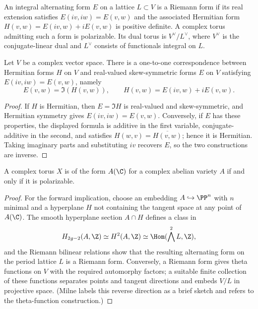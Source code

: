\begin{definition}
\label{def:milne-riemann-form}

An integral alternating form $E$ on a lattice $L\subset V$ is a Riemann form
if its real extension satisfies $E(iv,iw)=E(v,w)$ and the associated Hermitian
form $H(v,w)=E(iv,w)+iE(v,w)$ is positive definite.  A complex torus admitting
such a form is polarizable.  Its dual torus is $V^\vee/L^\vee$, where
$V^\vee$ is the conjugate-linear dual and $L^\vee$ consists of functionals
integral on $L$.
\end{definition}

\begin{lemma}
\label{lem:milne-riemann-hermitian}

Let $V$ be a complex vector space.  There is a one-to-one correspondence
between Hermitian forms $H$ on $V$ and real-valued skew-symmetric forms $E$ on
$V$ satisfying $E(iv,iw)=E(v,w)$, namely
\[
 E(v,w)=\Im(H(v,w)),\qquad
 H(v,w)=E(iv,w)+iE(v,w).
\]
\end{lemma}

\begin{proof}
If $H$ is Hermitian, then $E=\Im H$ is real-valued and skew-symmetric, and
Hermitian symmetry gives $E(iv,iw)=E(v,w)$.  Conversely, if $E$ has these
properties, the displayed formula is additive in the first variable,
conjugate-additive in the second, and satisfies
$H(w,v)=\overline{H(v,w)}$; hence it is Hermitian.  Taking imaginary parts and
substituting $iv$ recovers $E$, so the two constructions are inverse.
\end{proof}

\begin{theorem}
\label{thm:milne-polarizable-tori}

A complex torus $X$ is of the form $A(\C)$ for a complex abelian variety $A$
if and only if it is polarizable.
\end{theorem}

\begin{proof}
For the forward implication, choose an embedding $A\hookrightarrow\PP^n$
with $n$ minimal and a hyperplane $H$ not containing the tangent space at any
point of $A(\C)$.  The smooth hyperplane section $A\cap H$ defines a class in
\[
 H_{2g-2}(A,\Z)\simeq H^2(A,\Z)
 \simeq\Hom(\bigwedge^2L,\Z),
\]
and the Riemann bilinear relations show that the resulting alternating form
on the period lattice $L$ is a Riemann form.  Conversely, a Riemann form
gives theta functions on $V$ with the required automorphy factors; a suitable
finite collection of these functions separates points and tangent directions
and embeds $V/L$ in projective space.  (Milne labels this reverse direction
as a brief sketch and refers to the theta-function construction.)
\end{proof}

